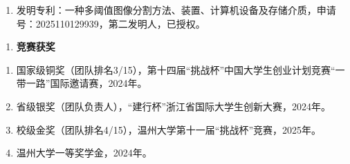 \documentclass{wzuthesis} %
\begin{document}
    \begin{enumerate}
        \renewcommand{\labelenumi}{[\arabic{enumi}]}
        \setlength{\itemindent}{0em}
        \setlength{\labelsep}{0.5em}

        \item 发明专利：一种多阈值图像分割方法、装置、计算机设备及存储介质，申请号：2025110129939，第二发明人，已授权。
    \end{enumerate}

    \begin{enumerate}[label=\arabic*., start=3]
        \item \textbf{竞赛获奖}
    \end{enumerate}

    \begin{enumerate}
        \renewcommand{\labelenumi}{[\arabic{enumi}]}
        \setlength{\itemindent}{0em}
        \setlength{\labelsep}{0.5em}

        \item 国家级铜奖（团队排名3/15），第十四届“挑战杯”中国大学生创业计划竞赛“一带一路”国际邀请赛，2024年。
        \item 省级银奖（团队负责人），“建行杯”浙江省国际大学生创新大赛，2024年。
        \item 校级金奖（团队排名4/15），温州大学第十一届“挑战杯”竞赛，2025年。
        \item 温州大学一等奖学金，2024年。
    \end{enumerate}
\fi

\end{document}
